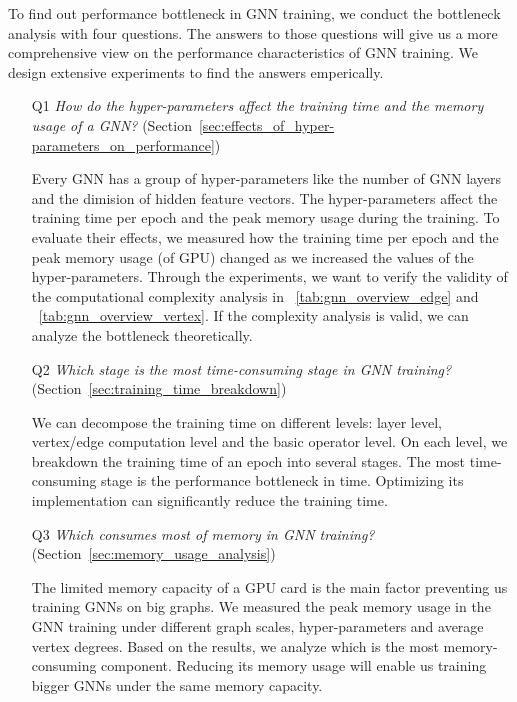 To find out performance bottleneck in GNN training, we conduct the bottleneck analysis with four questions.
The answers to those questions will give us a more comprehensive view on the performance characteristics of GNN training.
We design extensive experiments to find the answers emperically.
\begin{itemize}
	
	\item[Q1] \emph{How do the hyper-parameters affect the training time and the memory usage of a GNN?} (Section~\ref{sec:effects_of_hyper-parameters_on_performance})
	
			Every GNN has a group of hyper-parameters like the number of GNN layers and the dimision of hidden feature vectors. The hyper-parameters affect the training time per epoch and the peak memory usage during the training.
			To evaluate their effects, we measured how the training time per epoch and the peak memory usage (of GPU) changed as we increased the values of the hyper-parameters.
			Through the experiments, we want to verify the validity of the computational complexity analysis in \tablename~\ref{tab:gnn_overview_edge} and \tablename~\ref{tab:gnn_overview_vertex}.
			If the complexity analysis is valid, we can analyze the bottleneck theoretically.

	\item[Q2] \emph{Which stage is the most time-consuming stage in GNN training?} (Section~\ref{sec:training_time_breakdown})
	
			We can decompose the training time on different levels: layer level, vertex/edge computation level and the basic operator level.
			On each level, we breakdown the training time of an epoch into several stages. The most time-consuming stage is the performance bottleneck in time.
			Optimizing its implementation can significantly reduce the training time.
			
	\item[Q3] \emph{Which consumes most of memory in GNN training?} (Section~\ref{sec:memory_usage_analysis})
	
			The limited memory capacity of a GPU card is the main factor preventing us training GNNs on big graphs.
			We measured the peak memory usage in the GNN training under different graph scales, hyper-parameters and average vertex degrees.
			Based on the results, we analyze which is the most memory-consuming component.
			Reducing its memory usage will enable us training bigger GNNs under the same memory capacity.
		

\end{itemize}
